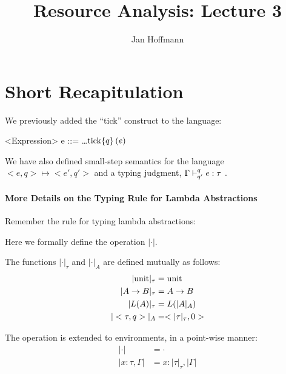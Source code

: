 \documentclass[ manuscript,screen, nonacm]{acmart}
\begin{document}
\title{Resource Analysis: Lecture 3}

\author{Jan Hoffmann}

\maketitle

\section{Short Recapitulation}
We previously added the ``tick'' construct to the language:
\begin{grammar}
<Expression> e ::= \dots \alt $\tickc{q}{e}$
\end{grammar}

We have also defined small-step semantics for the language
\( <e,q> \mapsto <e', q'> \) and a typing judgment,
\( \typ{\Gamma}{q}{q'}{e}{\tau} \)
.








\paragraph{More Details on the Typing Rule for Lambda Abstractions}

Remember the rule for typing lambda abstractions:
\begin{mathpar}
\end{mathpar}

Here we formally define the operation \(|\cdot|\).
\begin{definition}[\(|\cdot|\)]
  The functions \(|\cdot|_\tau\) and \(|\cdot|_A\) are defined mutually as follows:
  \begin{align*}
      |\unitc|_\tau &= \unitc \\
      |A \rightarrow B|_\tau &= A \rightarrow B\\
      |L(A)|_\tau &= L(|A|_A)\\
      |<\tau,q>|_A &= <|\tau|_\tau, 0>
  \end{align*}

  The operation is extended to environments, in a point-wise manner:
  \begin{align*}
      |\cdot| &= \cdot\\
      |x:\tau, \Gamma| &= x : |\tau|_\tau, |\Gamma|
  \end{align*}
\end{definition}
\end{document}
